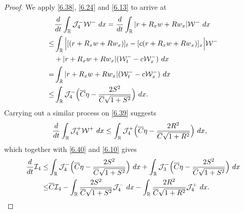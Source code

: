\documentclass[10pt,a4paper]{amsart}
\newcommand{\fr}{\frac}
\begin{document}
\begin{proof}
We apply \eqref{6.38}, \eqref{6.24} and \eqref{6.13} to arrive at
\begin{align}\label{6.40}
\begin{split}
&\fr{{\rm d}}{{\rm d}t}\int_{\mathbb{R}} \mathcal{J}_{4}^-\mathcal{W}^-\ {\rm d}x=\fr{{\rm d}}{{\rm d}t}\int_{\mathbb{R}}|r+R_xw+Rw_x|\mathcal{W}^-\ {\rm d}x \\
\leq &\int_{\mathbb{R}}\Big|[(r+R_xw+Rw_x)]_t -[c(r+R_xw+Rw_x)]_x\Big|\mathcal{W}^- \\ &+|r+R_xw+Rw_x|(\mathcal{W}^{-}_t-c\mathcal{W}^{-}_x)\ {\rm d}x \\
= &\int_{\mathbb{R}} |r+R_xw+Rw_x|(\mathcal{W}^{-}_t-c\mathcal{W}^{-}_x) \ {\rm d}x \\
\leq & \int_{\mathbb{R}} \mathcal{J}_{4}^- \Big(\overline{C}\eta-\fr{2S^2}{\overline{C}\sqrt{1+S^2}}\Big)\ {\rm d}x.
\end{split}
\end{align}
Carrying out a similar process on \eqref{6.39} suggests
\begin{align*}
\begin{split}
&\fr{{\rm d}}{{\rm d}t}\int_{\mathbb{R}} \mathcal{J}_{4}^+\mathcal{W}^+\ {\rm d}x
\leq  \int_{\mathbb{R}} \mathcal{J}_{4}^+ \Big(\overline{C}\eta-\fr{2R^2}{\overline{C}\sqrt{1+R^2}}\Big)\ {\rm d}x,
\end{split}
\end{align*}
which together with \eqref{6.40} and \eqref{6.10} gives
\begin{align}\label{6.41}
\begin{split}
\fr{{\rm d}}{{\rm d}t}\mathcal{I}_4
\leq & \int_{\mathbb{R}} \mathcal{J}_{4}^- \Big(\overline{C}\eta-\fr{2S^2}{\overline{C}\sqrt{1+S^2}}\Big)\ {\rm d}x +\int_{\mathbb{R}} \mathcal{J}_{3}^- \Big(\overline{C}\eta-\fr{2S^2}{\overline{C}\sqrt{1+S^2}}\Big)\ {\rm d}x \\
\leq & \overline{C}\mathcal{I}_4 -\int_{\mathbb{R}} \fr{2S^2}{\overline{C}\sqrt{1+S^2}}\mathcal{J}_{4}^-\ {\rm d}x -\int_{\mathbb{R}} \fr{2R^2}{\overline{C}\sqrt{1+R^2}}\mathcal{J}_{4}^+\ {\rm d}x.
\end{split}
\end{align}


\end{proof}
\end{document}
